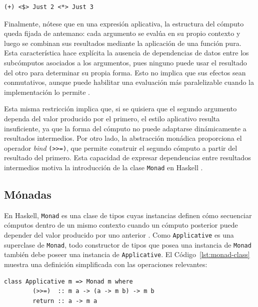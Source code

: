 \begin{lstlisting}[style=haskell,caption={Forma infija de la suma aplicativa sobre \texttt{Maybe}.},label={lst:applicative-maybe-sum-infix}]
    (+) <$> Just 2 <*> Just 3
\end{lstlisting}

Finalmente, nótese que en una expresión aplicativa, la estructura del cómputo queda fijada de antemano: cada argumento se evalúa en su propio contexto y luego se combinan sus resultados mediante la aplicación de una función pura. Esta característica hace explícita la ausencia de dependencias de datos entre los subcómputos asociados a los argumentos, pues ninguno puede usar el resultado del otro para determinar su propia forma. Esto no implica que sus efectos sean conmutativos, aunque puede habilitar una evaluación más paralelizable cuando la implementación lo permite \cite{McBride2008}.

Esta misma restricción implica que, si se quisiera que el segundo argumento dependa del valor producido por el primero, el estilo aplicativo resulta insuficiente, ya que la forma del cómputo no puede adaptarse dinámicamente a resultados intermedios. Por otro lado, la abstracción monádica proporciona el operador \textit{bind} \verb|(>>=)|, que permite construir el segundo cómputo a partir del resultado del primero. Esta capacidad de expresar dependencias entre resultados intermedios motiva la introducción de la clase \texttt{Monad} en \textsf{Haskell} \cite{Wadler1995}.

\subsection{Mónadas}

En \textsf{Haskell}, \texttt{Monad} es una clase de tipos cuyas instancias definen cómo secuenciar cómputos dentro de un mismo contexto cuando un cómputo posterior puede depender del valor producido por uno anterior \cite{Wadler1995}. Como \texttt{Applicative} es una superclase de \texttt{Monad}, todo constructor de tipos que posea una instancia de \texttt{Monad} también debe poseer una instancia de \texttt{Applicative}. El Código~\ref{lst:monad-class} muestra una definición simplificada con las operaciones relevantes:

\begin{lstlisting}[style=haskell,caption={Definición simplificada de la clase \texttt{Monad}.},label={lst:monad-class}]
    class Applicative m => Monad m where
        (>>=)  :: m a -> (a -> m b) -> m b
        return :: a -> m a
\end{lstlisting}


